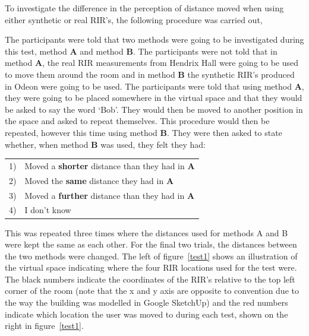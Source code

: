 \documentclass[../../main.tex]{subfiles}
\begin{document}
			To investigate the difference in the perception of distance moved when using either synthetic or real \ac{RIR}'s, the following procedure was carried out,


			The participants were told that two methods were going to be investigated during this test, method \textbf{A} and method \textbf{B}. The participants were not told that in method \textbf{A}, the real \ac{RIR} measurements from Hendrix Hall were going to be used to move them around the room and in method \textbf{B} the synthetic \ac{RIR}'s produced in Odeon were going to be used. The participants were told that using method \textbf{A}, they were going to be placed somewhere in the virtual space and that they would be asked to say the word `Bob'. They would then be moved to another position in the space and asked to repeat themselves. This procedure would then be repeated, however this time using method \textbf{B}. They were then asked to state whether, when method \textbf{B} was used, they felt they had:

			\vspace{5mm}
			\begin{center}
			    \begin{tabular}{l l}
			       1) & Moved a \textbf{shorter} distance than they had in \textbf{A}\\
			       2) & Moved the \textbf{same} distance they had in \textbf{A}\\
			       3) & Moved a \textbf{further} distance than they had in \textbf{A}\\
			       4) & I don't know\\
			    \end{tabular}
			\end{center}
			\vspace{5mm}

			This was repeated three times where the distances used for methods A and B were kept the same as each other. For the final two trials, the distances between the two methods were changed. The left of figure~\ref{test1} shows an illustration of the virtual space indicating where the four \ac{RIR} locations used for the test were. The black numbers indicate the coordinates of the \ac{RIR}'s  relative to the top left corner of the room (note that the x and y axis are opposite to convention due to the way the building was modelled in Google SketchUp) and the red numbers indicate which location the user was moved to during each test, shown on the right in figure~\ref{test1}.
\end{document}

